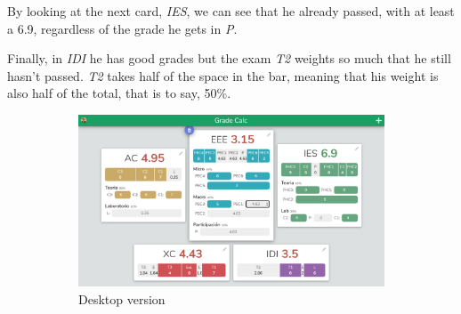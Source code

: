 By looking at the next card, \textit{IES}, we can see that he already passed, with at least a 6.9, regardless of the grade he gets in \textit{P}.

Finally, in \textit{IDI} he has good grades but the exam \textit{T2} weights so much that he still hasn't passed. \textit{T2} takes half of the space in the bar, meaning that his weight is also half of the total, that is to say, 50\%.

\vfill
\begin{figure}[ht!]
    \begin{subfigure}[b]{0.757\textwidth-0.1cm}
        \centering
        \includegraphics[width=\textwidth]{media/screenshots/screenshot-home-selected-pc.png}
        \caption{Desktop version}
    \end{subfigure}
    \hfill
    \begin{subfigure}[b]{0.243\textwidth-0.1cm}
        \centering

\end{subfigure}
\end{figure}
